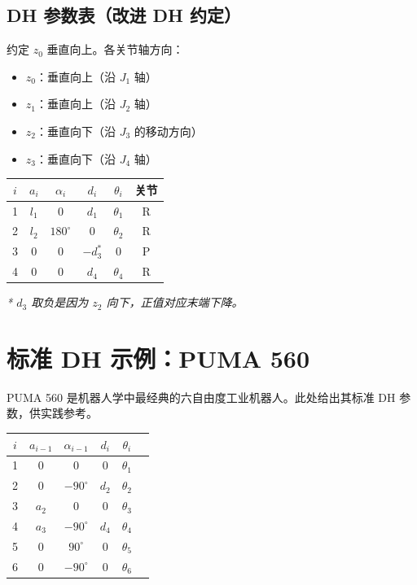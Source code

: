 \subsection{DH 参数表（改进 DH 约定）}

约定 $z_0$ 垂直向上。各关节轴方向：
\begin{itemize}
	\item $z_0$：垂直向上（沿 $J_1$ 轴）
	\item $z_1$：垂直向上（沿 $J_2$ 轴）
	\item $z_2$：垂直向下（沿 $J_3$ 的移动方向）
	\item $z_3$：垂直向下（沿 $J_4$ 轴）
\end{itemize}

\begin{center}
	\begin{tabular}{cccccc}
		\toprule
		$i$ & $a_i$ & $\alpha_i$ & $d_i$ & $\theta_i$ & 关节 \\
		\midrule
		1 & $l_1$ & 0          & $d_1$   & $\theta_1$ & R \\
		2 & $l_2$ & $180^\circ$ & 0       & $\theta_2$ & R \\
		3 & 0     & 0          & $-d_3^*$ & 0          & P \\
		4 & 0     & 0          & $d_4$   & $\theta_4$ & R \\
		\bottomrule
	\end{tabular}
\end{center}

\textit{* $d_3$ 取负是因为 $z_2$ 向下，正值对应末端下降。}

\section{标准 DH 示例：PUMA 560}

PUMA 560 是机器人学中最经典的六自由度工业机器人。此处给出其标准 DH 参数，供实践参考。

\begin{center}
	\begin{tabular}{cccccc}
		\toprule
		$i$ & $a_{i-1}$ & $\alpha_{i-1}$ & $d_i$ & $\theta_i$ \\
		\midrule
		1 & 0          & 0          & 0           & $\theta_1$ \\
		2 & 0          & $-90^\circ$ & $d_2$       & $\theta_2$ \\
		3 & $a_2$      & 0          & 0           & $\theta_3$ \\
		4 & $a_3$      & $-90^\circ$ & $d_4$       & $\theta_4$ \\
		5 & 0          & $90^\circ$  & 0           & $\theta_5$ \\
		6 & 0          & $-90^\circ$ & 0           & $\theta_6$ \\
		\bottomrule
	\end{tabular}
\end{center}

